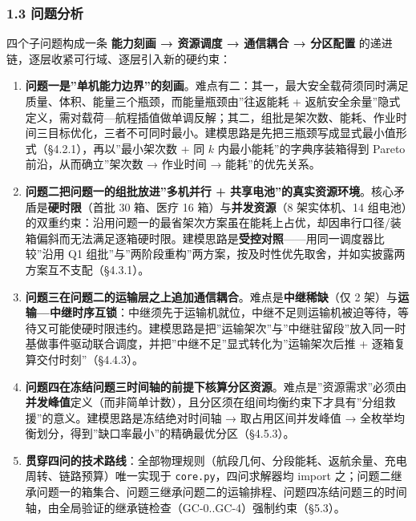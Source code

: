 \documentclass[
  10.5pt,
]{extarticle}
\providecommand{\tightlist}{%
  \setlength{\itemsep}{0pt}\setlength{\parskip}{0pt}}
\begin{document}
\subsubsection{1.3 问题分析}\label{ux95eeux9898ux5206ux6790}

四个子问题构成一条 \textbf{能力刻画 → 资源调度 → 通信耦合 → 分区配置}
的递进链，逐层收紧可行域、逐层引入新的硬约束：

\begin{enumerate}
\def\labelenumi{\arabic{enumi}.}
\tightlist
\item
  \textbf{问题一是''单机能力边界''的刻画}。难点有二：其一，最大安全载荷须同时满足质量、体积、能量三个瓶颈，而能量瓶颈由''往返能耗
  +
  返航安全余量''隐式定义，需对载荷---航程插值做单调反解；其二，组批是架次数、能耗、作业时间三目标优化，三者不可同时最小。建模思路是先把三瓶颈写成显式最小值形式（§4.2.1），再以''最小架次数
  + 同 \(k\) 内最小能耗''的字典序装箱得到 Pareto 前沿，从而确立''架次数
  → 作业时间 → 能耗''的优先关系。
\item
  \textbf{问题二把问题一的组批放进''多机并行 +
  共享电池''的真实资源环境}。核心矛盾是\textbf{硬时限}（首批 30 箱、医疗
  16 箱）与\textbf{并发资源}（8 架实体机、14
  组电池）的双重约束：沿用问题一的最省架次方案虽在能耗上占优，却因串行口径/装箱偏斜而无法满足逐箱硬时限。建模思路是\textbf{受控对照}------用同一调度器比较''沿用
  Q1
  组批''与''两阶段重构''两方案，按及时性优先取舍，并如实披露两方案互不支配（§4.3.1）。
\item
  \textbf{问题三在问题二的运输层之上追加通信耦合}。难点是\textbf{中继稀缺}（仅
  2
  架）与\textbf{运输---中继时序互锁}：中继须先于运输机就位，中继不足则运输机被迫等待，等待又可能使硬时限违约。建模思路是把''运输架次''与''中继驻留段''放入同一时基做事件驱动联合调度，并把''中继不足''显式转化为''运输架次后推
  + 逐箱复算交付时刻''（§4.4.3）。
\item
  \textbf{问题四在冻结问题三时间轴的前提下核算分区资源}。难点是''资源需求''必须由\textbf{并发峰值}定义（而非简单计数），且分区须在组间均衡约束下才具有''分组救援''的意义。建模思路是冻结绝对时间轴
  → 取占用区间并发峰值 →
  全枚举均衡划分，得到''缺口率最小''的精确最优分区（§4.5.3）。
\item
  \textbf{贯穿四问的技术路线}：全部物理规则（航段几何、分段能耗、返航余量、充电周转、链路预算）唯一实现于
  \texttt{core.py}，四问求解器均 import
  之；问题二继承问题一的箱集合、问题三继承问题二的运输排程、问题四冻结问题三的时间轴，由全局验证的继承链检查（GC-0..GC-4）强制约束（§5.3）。
\end{enumerate}
\end{document}
